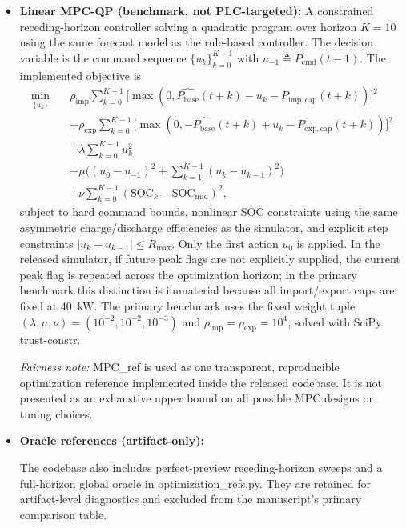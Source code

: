 \documentclass[preprint,12pt]{elsarticle}
\def\texttt#1{#1}%
\newcommand{\Rmax}{R_{\max}}
\newcommand{\SOC}{\mathrm{SOC}}
\newcommand{\Pcmd}{P_{\mathrm{cmd}}}
\newcommand{\Pbase}{P_{\mathrm{base}}}
\begin{document}
\begin{itemize}
\item \textbf{Linear MPC-QP (benchmark, not PLC-targeted):}
A constrained receding-horizon controller solving a quadratic program over horizon $K=10$ using the same forecast model as the rule-based controller. The decision variable is the command sequence $\{u_k\}_{k=0}^{K-1}$ with $u_{-1}\triangleq \Pcmd(t-1)$. The implemented objective is
\begin{equation}
\begin{aligned}
\min_{\{u_k\}} \quad
& \rho_{\mathrm{imp}}\sum_{k=0}^{K-1}\big[\max(0,\widehat{\Pbase}(t+k)-u_k-P_{\mathrm{imp,cap}}(t+k))\big]^2 \\
&+ \rho_{\mathrm{exp}}\sum_{k=0}^{K-1}\big[\max(0,-\widehat{\Pbase}(t+k)+u_k-P_{\mathrm{exp,cap}}(t+k))\big]^2 \\
&+ \lambda \sum_{k=0}^{K-1} u_k^2 \\
&+ \mu \Big((u_0-u_{-1})^2 + \sum_{k=1}^{K-1}(u_k-u_{k-1})^2\Big) \\
&+ \nu \sum_{k=0}^{K-1}(\SOC_k-\SOC_{\mathrm{mid}})^2 ,
\end{aligned}
\label{eq:mpc_qp_obj}
\end{equation}
subject to hard command bounds, nonlinear SOC constraints using the same asymmetric charge/discharge efficiencies as the simulator, and explicit step constraints $|u_k-u_{k-1}|\le \Rmax$. Only the first action $u_0$ is applied. In the released simulator, if future peak flags are not explicitly supplied, the current peak flag is repeated across the optimization horizon; in the primary benchmark this distinction is immaterial because all import/export caps are fixed at 40~kW. The primary benchmark uses the fixed weight tuple $(\lambda,\mu,\nu)=(10^{-2},10^{-2},10^{-3})$ and $\rho_{\mathrm{imp}}=\rho_{\mathrm{exp}}=10^4$, solved with SciPy \texttt{trust-constr}.\par \textit{Fairness note:} \texttt{MPC\_ref} is used as one transparent, reproducible optimization reference implemented inside the released codebase. It is not presented as an exhaustive upper bound on all possible MPC designs or tuning choices.

\item \textbf{Oracle references (artifact-only):}\par
The codebase also includes perfect-preview receding-horizon sweeps and a full-horizon global oracle in \texttt{optimization\_refs.py}. They are retained for artifact-level diagnostics and excluded from the manuscript's primary comparison table.
\end{itemize}
\end{document}
